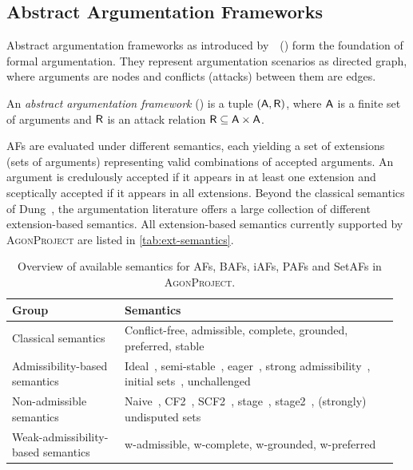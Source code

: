 \documentclass[
]{ceurart}
\newcommand{\agon}{\textsc{AgonProject}\xspace}
\begin{document}
\subsection{Abstract Argumentation Frameworks}

Abstract argumentation frameworks as introduced by~\citeauthor{DBLP:journals/ai/Dung95}~(\citeyear{DBLP:journals/ai/Dung95}) form the foundation of formal argumentation. They represent argumentation scenarios as directed graph, where arguments are nodes and conflicts (attacks) between them are edges.

\begin{definition}\label{def:af}
    An \emph{abstract argumentation framework} (\AF) is a tuple $(\arguments,\attacks)$, where $\arguments$ is a finite set of arguments and $\attacks$ is an attack relation $\attacks\subseteq \arguments\times\arguments$.
\end{definition}

AFs are evaluated under different semantics, each yielding a set of extensions (sets of arguments) representing valid combinations of accepted arguments. An argument is credulously accepted if it appears in at least one extension and sceptically accepted if it appears in all extensions.
Beyond the classical semantics of Dung~\cite{DBLP:journals/ai/Dung95}, the argumentation literature offers a large collection of different extension-based semantics.
All extension-based semantics currently supported by \agon are listed in \autoref{tab:ext-semantics}.

\begin{table}[ht]
    \renewcommand{\arraystretch}{1.2}
    \centering
    \caption{Overview of available semantics for AFs, BAFs, iAFs, PAFs and SetAFs in \agon.}
    \begin{tabular}{@{}p{0.28\linewidth}p{0.68\linewidth}@{}}
            \toprule
            \textbf{Group} & \textbf{Semantics}\\
            \midrule
            Classical semantics & Conflict-free, admissible, complete, grounded, preferred, stable~\cite{DBLP:journals/ai/Dung95}\\
            Admissibility-based semantics& Ideal~\cite{DBLP:journals/ai/DungMT07}, semi-stable~\cite{verheij1996two,DBLP:conf/comma/Caminada06}, eager~\cite{caminada2007comparing}, strong admissibility~\cite{DBLP:conf/comma/Caminada14}, initial sets~\cite{DBLP:journals/jancl/XuC18}, unchallenged~\cite{DBLP:conf/comma/BengelT22}\\
            Non-admissible semantics & Naive~\cite{DBLP:journals/ai/BaroniG07}, CF2~\cite{DBLP:journals/ai/BaroniGG05a}, SCF2~\cite{DBLP:conf/ki/CramerT19}, stage~\cite{verheij1996two}, stage2~\cite{DBLP:journals/logcom/DvorakG16}, (strongly) undisputed sets~\cite{DBLP:conf/aaai/Thimm23}\\
            Weak-admissibility-based semantics & w-admissible, w-complete, w-grounded, w-preferred~\cite{DBLP:conf/aaai/BaumannBU20}\\
            \bottomrule
        \end{tabular}
    \label{tab:ext-semantics}
\end{table}
\end{document}
